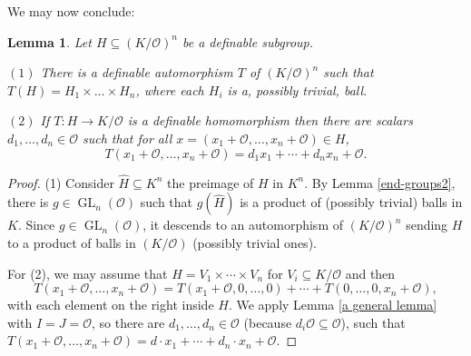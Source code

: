 \documentclass[11pt]{amsart}
\DeclareMathOperator{\gl}{GL} \DeclareMathOperator{\agl}{AGL}
\newtheorem{lemma}[theorem]{Lemma}
\theoremstyle{definition}
\newcommand{\CO}{{\mathcal O}}
\newcommand{\0}{\emptyset}
\def\sub{\subseteq}
\begin{document}
We may now conclude:
\begin{lemma}\label{K/O end-groups2}
Let $H\sub (K/\CO)^n$ be a definable subgroup.

$(1)$ There is a definable automorphism $T$ of $(K/\CO)^n$ such that $T(H)=H_1\times \dots \times H_n$, where each $H_i$ is a, possibly trivial,  ball.  

$(2)$ If $T:H\to K/\CO$ is a  definable homomorphism then there are scalars $d_1,\ldots, d_n\in \CO$ such that for all $x=(x_1+\CO,\ldots, x_n+\CO)\in H$, 
\[T(x_1+\CO,\ldots,x_n+\CO)=d_1x_1+\cdots+d_nx_n+\CO.\]
\end{lemma}
\begin{proof} 
(1) Consider $\hat H\sub K^n$ the preimage of $H$ in $K^n.$ By Lemma  \ref{end-groups2}, there is $g\in \gl_n(\CO)$ such that $g(\hat H) $ is a product of (possibly trivial) balls in $K$. Since $g\in \gl_n(\CO)$, it descends to an automorphism of $(K/\CO)^n$ sending $H$ to a product of balls in $(K/\CO)$ (possibly trivial ones).

For (2), we may assume that $H=V_1\times \cdots \times V_n$ for $V_i\sub K/\CO$ and then 
\[T(x_1+\CO,\ldots, x_n+\CO)=T(x_1+\CO,0,\ldots,0)+\cdots+T(0,\ldots,0,x_n+\CO),\] with each element on the right inside $H$. We apply Lemma \ref{a general lemma} with $I=J=\CO$, so there are $d_1,\ldots, d_n\in \CO$ (because $d_i\CO\subseteq \CO$), such that $T(x_1+\CO,\ldots, x_n+\CO)=d\cdot x_1+\cdots+d_n\cdot x_n+\CO$. 
\end{proof}
\end{document}
